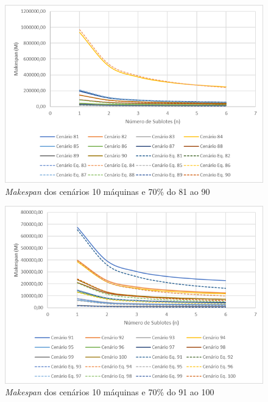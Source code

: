\begin{figure}[H]
    \centering
     \includegraphics[width=13cm]{Apendices/Figuras/10m70_81-90.png}
     \caption{\textit{Makespan} dos cenários 10 máquinas e 70\% do 81 ao 90}
    \label{fig:10m70_81-90}
\end{figure}

\begin{figure}[H]
    \centering
     \includegraphics[width=13cm]{Apendices/Figuras/10m70_91-100.png}
     \caption{\textit{Makespan} dos cenários 10 máquinas e 70\% do 91 ao 100}
    \label{fig:10m70_91-100}
\end{figure}